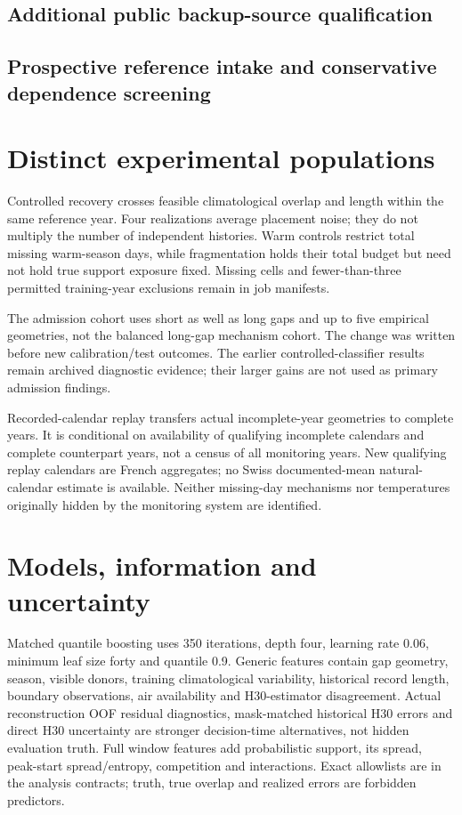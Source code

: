 \documentclass[draft]{agujournal2025}
\begin{document}
\subsection{Additional public backup-source qualification}


\subsection{Prospective reference intake and conservative dependence screening}


\section{Distinct experimental populations}
Controlled recovery crosses feasible climatological overlap and length within the same reference year. Four realizations average placement noise; they do not multiply the number of independent histories. Warm controls restrict total missing warm-season days, while fragmentation holds their total budget but need not hold true support exposure fixed. Missing cells and fewer-than-three permitted training-year exclusions remain in job manifests.

The admission cohort uses short as well as long gaps and up to five empirical geometries, not the balanced long-gap mechanism cohort. The change was written before new calibration/test outcomes. The earlier controlled-classifier results remain archived diagnostic evidence; their larger gains are not used as primary admission findings.

Recorded-calendar replay transfers actual incomplete-year geometries to complete years. It is conditional on availability of qualifying incomplete calendars and complete counterpart years, not a census of all monitoring years. New qualifying replay calendars are French aggregates; no Swiss documented-mean natural-calendar estimate is available. Neither missing-day mechanisms nor temperatures originally hidden by the monitoring system are identified.

\section{Models, information and uncertainty}
Matched quantile boosting uses 350 iterations, depth four, learning rate 0.06, minimum leaf size forty and quantile 0.9. Generic features contain gap geometry, season, visible donors, training climatological variability, historical record length, boundary observations, air availability and H30-estimator disagreement. Actual reconstruction OOF residual diagnostics, mask-matched historical H30 errors and direct H30 uncertainty are stronger decision-time alternatives, not hidden evaluation truth. Full window features add probabilistic support, its spread, peak-start spread/entropy, competition and interactions. Exact allowlists are in the analysis contracts; truth, true overlap and realized errors are forbidden predictors.
\end{document}
